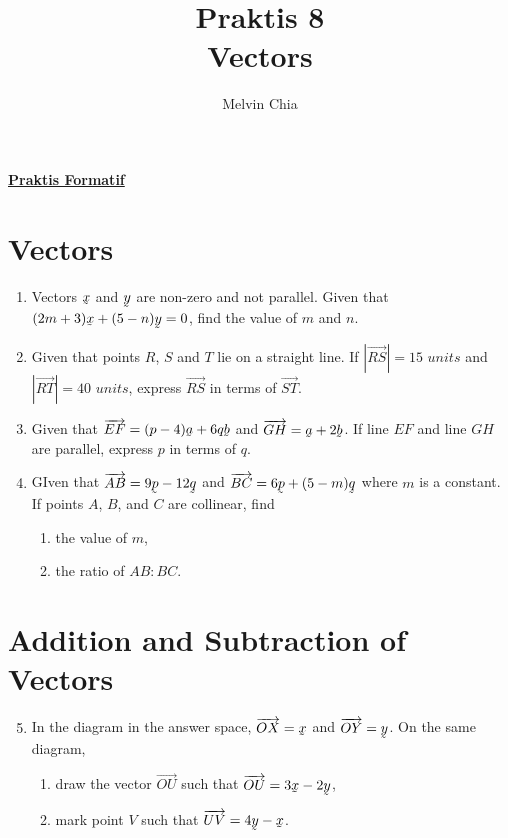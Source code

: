 \documentclass{report}
\title{Praktis 8\\Vectors}
\author{Melvin Chia}
\renewcommand{\vec}[1]{\underaccent{\tilde}{#1}}
\begin{document}
\maketitle

\begin{multicols*}{2}
    \noindent\Large{\underline{\textbf{Praktis Formatif}}}
    \normalsize
    \section{Vectors}

    \begin{enumerate}
        \item Vectors $\vec{x}$ and $\vec{y}$ are non-zero and not parallel. Given that
              $(2m+3)\vec{x} + (5-n)\vec{y} = 0$, find the value of $m$ and $n$.

        \item Given that points $R$, $S$ and $T$ lie on a straight line. If
              $|\overrightarrow{RS}| = 15\textit{ units}$ and $|\overrightarrow{RT}| =
                  40\textit{ units}$, express $\overrightarrow{RS}$ in terms of
              $\overrightarrow{ST}$.

        \item Given that $\overrightarrow{EF} = (p - 4)\vec{a} + 6q\vec{b}$ and
              $\overrightarrow{GH} = \vec{a} + 2\vec{b}$. If line $EF$ and line $GH$ are
              parallel, express $p$ in terms of $q$.

        \item GIven that $\overrightarrow{AB} = 9\vec{p} - 12\vec{q}$ and
              $\overrightarrow{BC} = 6\vec{p} + (5-m)\vec{q}$ where $m$ is a constant. If
              points $A$, $B$, and $C$ are collinear, find
              \begin{enumerate}
                  \item the value of $m$,

                  \item the ratio of $AB:BC$.
              \end{enumerate}
    \end{enumerate}

    \section{Addition and Subtraction of Vectors}

    \begin{enumerate}
        \setcounter{enumi}{4}
        \item In the diagram in the answer space, $\overrightarrow{OX} = \vec{x}$ and
              $\overrightarrow{OY} = \vec{y}$. On the same diagram,
              \begin{enumerate}
                  \item draw the vector $\overrightarrow{OU}$ such that $\overrightarrow{OU} = 3\vec{x}
                            - 2\vec{y}$,
                  \item  mark point $V$ such that $\overrightarrow{UV} = 4\vec{y} - \vec{x}$.
              \end{enumerate}


\end{enumerate}
\end{multicols*}
\end{document}
